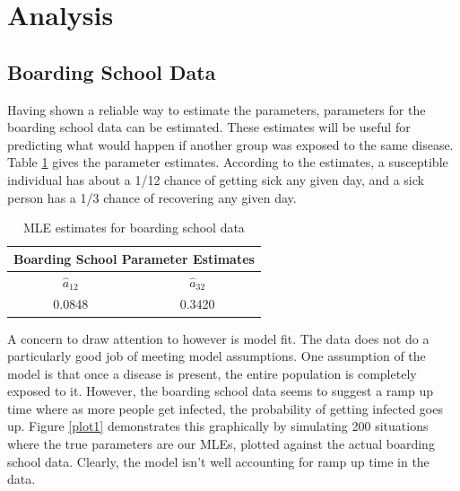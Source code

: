 \documentclass{svproc}
\begin{document}
\section{Analysis}
\subsection*{Boarding School Data}
Having shown a reliable way to estimate the parameters, parameters for the boarding school data can be estimated. These estimates will be useful for predicting what would happen if another group was exposed to the same disease. Table \ref{tab2} gives the parameter estimates. According to the estimates, a susceptible individual has about a 1/12 chance of getting sick any given day, and a sick person has a 1/3 chance of recovering any given day.
\begin{table}
\centering
\setlength{\tabcolsep}{30pt}
\begin{tabular}{|c|c|}

\hline
\multicolumn{2}{|c|}{Boarding School Parameter Estimates} \\ \hline 
$\hat{a}_{12}$ & $\hat{a}_{32}$ \\ \hline
0.0848 & 0.3420 \\ \hline
\end{tabular}
\caption{MLE estimates for boarding school data}
\label{tab2}
\end{table}

A concern to draw attention to however is model fit. The data does not do a particularly good job of meeting model assumptions. One assumption of the model is that once a disease is present, the entire population is completely exposed to it. However, the boarding school data seems to suggest a ramp up time where as more people get infected, the probability of getting infected goes up. Figure \ref{plot1} demonstrates this graphically by simulating 200 situations where the true parameters are our MLEs, plotted against the actual boarding school data. Clearly, the model isn't well accounting for ramp up time in the data.
\end{document}
